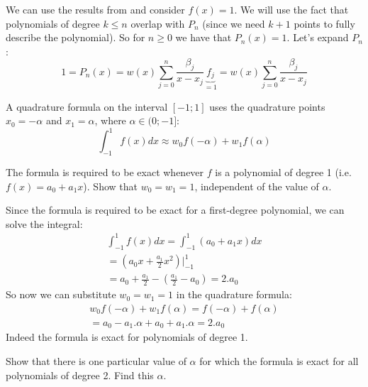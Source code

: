 \documentclass[a4paper, oneside]{article}
\begin{document}
\begin{solution}
    We can use the results from  and consider $f(x) = 1$. We will use the fact that polynomials of degree $k \leq n$ overlap with $P_n$ (since we need $k+1$ points to fully describe the polynomial). So for $n \geq 0$ we have that $P_n(x) = 1$. Let's expand $P_n$:
    \begin{equation}
        1 = P_n(x) = w(x) \sum_{j=0}^n \frac{\beta_j}{x-x_j} \underbrace{f_j}_{=1} = w(x) \sum_{j=0}^n \frac{\beta_j}{x-x_j}
    \end{equation}
\end{solution}
\begin{problem}
A quadrature formula on the interval $[-1; 1]$ uses the quadrature points $x_0 = -\alpha$ and $x_1 = \alpha$, where $\alpha \in (0; -1]$:
\begin{equation}
    \int_{-1}^1 f(x) dx \approx w_0 f(-\alpha) + w_1 f(\alpha)
\end{equation}

The formula is required to be exact whenever $f$ is a polynomial of
degree 1 (i.e. $f(x) = a_0 + a_1 x$). Show that $w_0 = w_1 = 1$, independent of the value of $\alpha$.
\end{problem}
\begin{solution}
    Since the formula is required to be exact for a first-degree polynomial, we can solve the integral:
    \begin{align}
        \int_{-1}^1 f(x) dx = \int_{-1}^1 (a_0 + a_1 x) dx \\
        = (a_0 x + \frac{a_1}{2} x^2)\bigg\rvert_{-1}^1    \\
        = a_0 + \frac{a_1}{2} - (\frac{a_1}{2} - a_0) = 2.a_0
    \end{align}
    So now we can substitute $w_0 = w_1 = 1$ in the quadrature formula:
    \begin{align}
        w_0 f(-\alpha) + w_1 f(\alpha) = f(-\alpha) + f(\alpha) \\
        = a_0 - a_1.\alpha + a_0 + a_1.\alpha = 2.a_0
    \end{align}
    Indeed the formula is exact for polynomials of degree 1.
\end{solution}
\begin{problem}
Show that there is one particular value of $\alpha$ for which the formula is exact for all polynomials of degree 2. Find this $\alpha$.
\end{problem}
\end{document}
